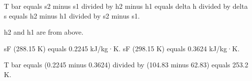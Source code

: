 T bar equals s2 minus s1 divided by h2 minus h1 equals delta h divided by delta s equals h2 minus h1 divided by s2 minus s1.  

h2 and h1 are from above.  

sF (288.15 K) equals 0.2245 kJ/kg·K.  
sF (298.15 K) equals 0.3624 kJ/kg·K.  

T bar equals (0.2245 minus 0.3624) divided by (104.83 minus 62.83) equals 253.2 K.